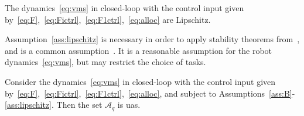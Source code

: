 \documentclass[../main.tex]{subfiles}
\begin{document}
\begin{assumption}\label{ass:lipschitz}
    The dynamics~\eqref{eq:vms} in closed-loop with the control input given by~\eqref{eq:F},~\eqref{eq:Fictrl},~\eqref{eq:F1ctrl},~\eqref{eq:alloc} are Lipschitz.
\end{assumption}
%
\begin{remark}
    Assumption~\ref{ass:lipschitz} is necessary in order to apply stability theorems from~\citet{Maggiore2023}, and is a common assumption~\citep{Dietrich2020}. It is a reasonable assumption for the robot dynamics~\eqref{eq:vms}, but may restrict the choice of tasks.
\end{remark}
%
\begin{proposition}\label{prop:UAS}
    Consider the dynamics~\eqref{eq:vms} in closed-loop with the control input given by~\eqref{eq:F},~\eqref{eq:Fictrl},~\eqref{eq:F1ctrl},~\eqref{eq:alloc}, and subject to Assumptions~\ref{ass:B}-\ref{ass:lipschitz}. Then the set $\mathcal{A}_q$ is \gls{uas}. 
\end{proposition}
\end{document}
